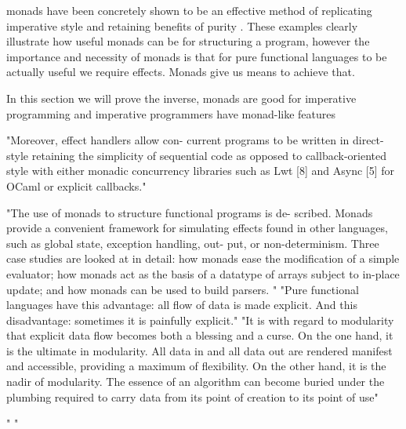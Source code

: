 monads have been concretely shown to be an effective method of replicating
imperative style and retaining benefits of purity \cite{PeytonJones:1993}.
These examples clearly illustrate how useful monads can be for structuring a program,
however the importance and necessity of monads is that for pure functional languages
to be actually useful we require effects. Monads give us means to achieve that.

In this section we will prove the inverse,
monads are good for imperative programming
and imperative programmers have monad-like features



"Moreover, effect handlers allow con- current programs to be written in direct-style retaining the simplicity of sequential code as opposed to callback-oriented style with either monadic concurrency libraries such as Lwt [8] and Async [5] for OCaml or explicit callbacks."
\cite{dolaneffectively}

"The use of monads to structure functional programs is de- scribed. Monads provide a convenient framework for simulating effects found in other languages, such as global state, exception handling, out- put, or non-determinism. Three case studies are looked at in detail: how monads ease the modification of a simple evaluator; how monads act as the basis of a datatype of arrays subject to in-place update; and how monads can be used to build parsers.
"
"Pure functional languages have this advantage: all flow of data is made explicit. And this disadvantage: sometimes it is painfully explicit."
"It is with regard to modularity that explicit data flow becomes both a blessing and a curse. On the one hand, it is the ultimate in modularity. All data in and all data out are rendered manifest and accessible, providing a maximum of flexibility. On the other hand, it is the nadir of modularity. The essence of an algorithm can become buried under the plumbing required to carry data from its point of creation to its point of use"
\cite{wadler1995monads}

"
"\cite{PeytonJones:1993}


